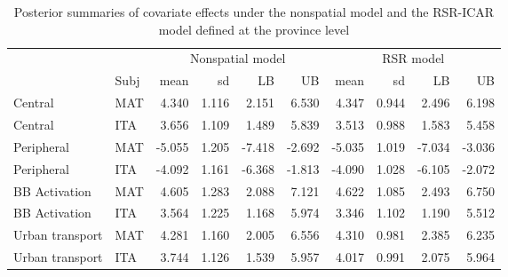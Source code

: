 \documentclass{book}
\begin{document}
\begin{appendices}
\begin{table}[ht]
\centering
\begin{tabular}{ll|rrrr|rrrr}
  \hline
  && \multicolumn{4}{c|}{Nonspatial model} & \multicolumn{4}{c}{RSR model}\\
 & Subj & mean & sd & LB & UB & mean & sd & LB & UB \\ 
  \hline
  Central & MAT & 4.340 & 1.116 & 2.151 & 6.530 & 4.347 & 0.944 & 2.496 & 6.198 \\ 
  Central & ITA & 3.656 & 1.109 & 1.489 & 5.839 & 3.513 & 0.988 & 1.583 & 5.458 \\ 
  Peripheral & MAT & -5.055 & 1.205 & -7.418 & -2.692 & -5.035 & 1.019 & -7.034 & -3.036 \\ 
  Peripheral  & ITA & -4.092 & 1.161 & -6.368 & -1.813 & -4.090 & 1.028 & -6.105 & -2.072 \\ 
  BB Activation & MAT & 4.605 & 1.283 & 2.088 & 7.121 & 4.622 & 1.085 & 2.493 & 6.750 \\ 
  BB Activation & ITA & 3.564 & 1.225 & 1.168 & 5.974 & 3.346 & 1.102 & 1.190 & 5.512 \\ 
  Urban transport & MAT & 4.281 & 1.160 & 2.005 & 6.556 & 4.310 & 0.981 & 2.385 & 6.235 \\ 
  Urban transport & ITA & 3.744 & 1.126 & 1.539 & 5.957 & 4.017 & 0.991 & 2.075 & 5.964 \\ 
   \hline
\end{tabular}
\caption{Posterior summaries of covariate effects under the nonspatial model and the RSR-ICAR model defined at the province level}
\label{tab:null_RSR}
\end{table}


\end{appendices}
\end{document}
